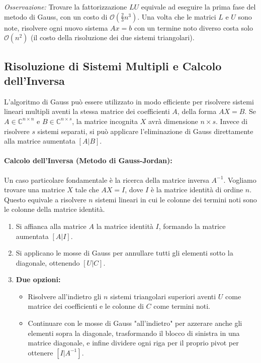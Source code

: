 \documentclass[a4paper,12pt]{article}
\begin{document}
	\textit{Osservazione:} Trovare la fattorizzazione $LU$ equivale ad eseguire la prima fase del metodo di Gauss, con un costo di $\mathcal{O}(\frac{2}{3}n^3)$. Una volta che le matrici $L$ e $U$ sono note, risolvere ogni nuovo sistema $Ax = b$ con un termine noto diverso costa solo $\mathcal{O}(n^2)$ (il costo della risoluzione dei due sistemi triangolari).
	\subsection{Risoluzione di Sistemi Multipli e Calcolo dell'Inversa}
	
	L'algoritmo di Gauss può essere utilizzato in modo efficiente per risolvere sistemi lineari multipli aventi la stessa matrice dei coefficienti $A$, della forma $AX = B$.
	Se $A \in \mathbb{C}^{n \times n}$ e $B \in \mathbb{C}^{n \times s}$, la matrice incognita $X$ avrà dimensione $n \times s$. Invece di risolvere $s$ sistemi separati, si può applicare l'eliminazione di Gauss direttamente alla matrice aumentata $[A | B]$.
	
	\paragraph{Calcolo dell'Inversa (Metodo di Gauss-Jordan):}
	Un caso particolare fondamentale è la ricerca della matrice inversa $A^{-1}$. Vogliamo trovare una matrice $X$ tale che $AX = I$, dove $I$ è la matrice identità di ordine $n$.
	Questo equivale a risolvere $n$ sistemi lineari in cui le colonne dei termini noti sono le colonne della matrice identità.
	
	\begin{tcolorbox}[title=Procedura Pratica per l'Inversa, colback=white]
		\begin{enumerate}
			\item Si affianca alla matrice $A$ la matrice identità $I$, formando la matrice aumentata $[A | I]$.
			\item Si applicano le mosse di Gauss per annullare tutti gli elementi sotto la diagonale, ottenendo $[U | C]$.
			\item \textbf{Due opzioni:}
			\begin{itemize}
				\item Risolvere all'indietro gli $n$ sistemi triangolari superiori aventi $U$ come matrice dei coefficienti e le colonne di $C$ come termini noti.
				\item Continuare con le mosse di Gauss "all'indietro" per azzerare anche gli elementi sopra la diagonale, trasformando il blocco di sinistra in una matrice diagonale, e infine dividere ogni riga per il proprio pivot per ottenere $[I | A^{-1}]$.
			\end{itemize}
		\end{enumerate}
	\end{tcolorbox}
	
\end{document}
